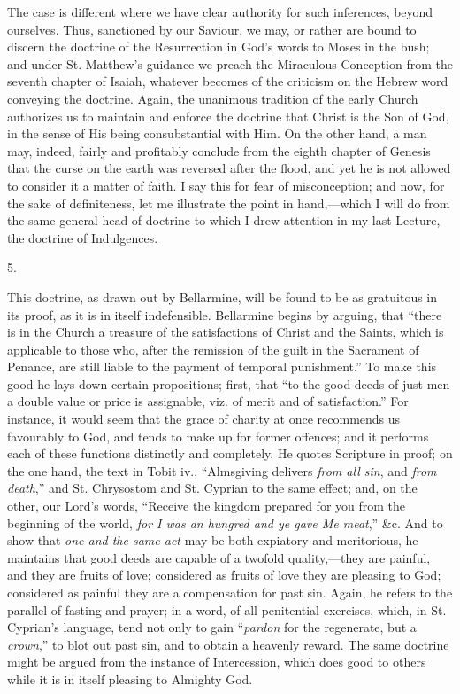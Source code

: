 The case is different where we have clear authority for such
inferences, beyond ourselves. Thus, sanctioned by our Saviour, we may,
or rather are bound to discern the doctrine of the Resurrection in God's
words to Moses in the bush; and under St. Matthew's guidance we preach
the Miraculous Conception from the seventh chapter of Isaiah, whatever
becomes of the criticism on the Hebrew word conveying the doctrine.
Again, the unanimous tradition of the early Church authorizes us to
maintain and enforce the doctrine that Christ is the Son of God, in
the sense of His being consubstantial with Him. On the other hand, a
man may, indeed, fairly and profitably conclude from the eighth
chapter of Genesis that the curse on the earth was reversed after the
flood, and yet he is not allowed to consider it a matter of faith. I
say this for fear of misconception; and now, for the sake of
definiteness, let me illustrate the point in hand,—which I will do
from the same general head of doctrine to which I drew attention in my
last Lecture, the doctrine of Indulgences.

5.

This doctrine, as drawn out by Bellarmine, will be found to be as
gratuitous in its proof, as it is in itself indefensible. Bellarmine
begins by arguing, that ``there is in the Church a treasure of the
satisfactions of Christ and the Saints, which is applicable to those
who, after the remission of the guilt in the Sacrament of Penance, are
still liable to the payment of temporal punishment.'' To make this
good he lays down certain propositions; first, that ``to the good
deeds of just men a double value or price is assignable, viz. of merit
and of satisfaction.'' For instance, it would seem that the grace
of charity at once recommends us favourably to God, and tends to make
up for former offences; and it performs each of these functions
distinctly and completely. He quotes Scripture in proof; on the one
hand, the text in Tobit iv., ``Almsgiving delivers \emph{from all sin},
and \emph{from death},'' and St. Chrysostom and St. Cyprian to the
same effect; and, on the other, our Lord's words, ``Receive the
kingdom prepared for you from the beginning of the world, \emph{for I was
an hungred and ye gave Me meat},'' \&c. And to show that \emph{one
and the same act} may be both expiatory and meritorious, he
maintains that good deeds are capable of a twofold quality,—they are
painful, and they are fruits of love; considered as fruits of love
they are pleasing to God; considered as painful they are a
compensation for past sin. Again, he refers to the parallel of fasting
and prayer; in a word, of all penitential exercises, which, in
St. Cyprian's language, tend not only to gain ``\emph{pardon} for
the regenerate, but a \emph{crown},'' to blot out past sin, and to
obtain a heavenly reward. The same doctrine might be argued from the
instance of Intercession, which does good to others while it is in
itself pleasing to Almighty God.

